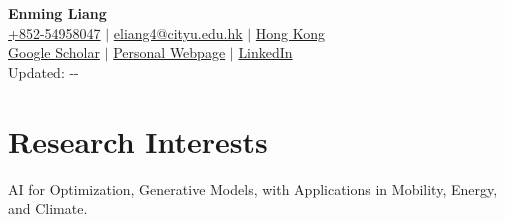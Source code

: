 \documentclass[letterpaper,11pt]{article}
\renewcommand{\today}{\number\year-\number\month-\number\day }
\begin{document}

\begin{center}
    \textbf{\Huge Enming Liang} \\ 
    \vspace{5pt}
    \faMobile \hspace{.5pt} \href{tel:85254958047}{+852-54958047}
    $|$
    \faAt \hspace{.5pt} \href{eliang4@cityu.edu.hk}{eliang4@cityu.edu.hk}
    $|$
    \faMapMarker \hspace{.5pt} \href{d}{Hong Kong} 
\\   \vspace{5pt}
    \faGoogle \hspace{.5pt} \href{https://scholar.google.com.sg/citations?user=Todfu6AAAAAJ&hl=zh-CN}{Google Scholar}
    $|$
    \faGithub \hspace{.5pt} \href{https://emliang.github.io/}{Personal Webpage}
    $|$
    \faLinkedinSquare \hspace{.5pt} \href{https://www.linkedin.com/in/enming-liang-95b5b216a/}{LinkedIn}
\\    \vspace{5pt}
     Updated: \today
\end{center}





\section{\LARGE Research Interests}
  \vspace{5pt}
    {\large \centering AI for Optimization, Generative Models, 
    with Applications in Mobility, Energy, and Climate.\\}{}
  \vspace{5pt}
  
    
\end{document}
